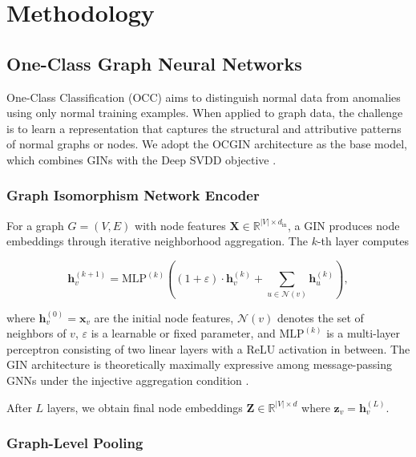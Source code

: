 \chapter{Methodology}

\section{One-Class Graph Neural Networks}
\label{sec:ocgin}

One-Class Classification (OCC) aims to distinguish normal data from anomalies using only normal training examples. When applied to graph data, the challenge is to learn a representation that captures the structural and attributive patterns of normal graphs or nodes. We adopt the \ac{OCGIN} architecture \citep{wang2021ocgin} as the base model, which combines \acp{GIN} \citep{xu2018gin} with the Deep \ac{SVDD} objective \citep{ruff2018deepsvdd}.

\subsection{Graph Isomorphism Network Encoder}
\label{sec:gin}

For a graph $G = (V, E)$ with node features $\mathbf{X} \in \mathbb{R}^{|V| \times d_{\text{in}}}$, a \ac{GIN} produces node embeddings through iterative neighborhood aggregation. The $k$-th layer computes

\begin{equation}
\mathbf{h}_v^{(k+1)} = \mathrm{MLP}^{(k)}\!\left( (1 + \varepsilon) \cdot \mathbf{h}_v^{(k)} + \sum_{u \in \mathcal{N}(v)} \mathbf{h}_u^{(k)} \right),
\label{eq:gin}
\end{equation}

where $\mathbf{h}_v^{(0)} = \mathbf{x}_v$ are the initial node features, $\mathcal{N}(v)$ denotes the set of neighbors of $v$, $\varepsilon$ is a learnable or fixed parameter, and $\mathrm{MLP}^{(k)}$ is a multi-layer perceptron consisting of two linear layers with a ReLU activation in between. The GIN architecture is theoretically maximally expressive among message-passing \acp{GNN} under the injective aggregation condition \citep{xu2018gin}.

After $L$ layers, we obtain final node embeddings $\mathbf{Z} \in \mathbb{R}^{|V| \times d}$ where $\mathbf{z}_v = \mathbf{h}_v^{(L)}$.

\subsection{Graph-Level Pooling}
\label{sec:pooling}

